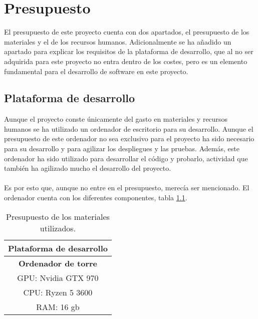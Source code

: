 \chapter{Presupuesto}
\thispagestyle{fancy}
El presupuesto de este proyecto cuenta con dos apartados, el presupuesto de los materiales y el de los recursos humanos. Adicionalmente se ha añadido un apartado para explicar los requisitos de la plataforma de desarrollo, que al no ser adquirida para este proyecto no entra dentro de los costes, pero es un elemento fundamental para el desarrollo de software en este proyecto. 

\section{Plataforma de desarrollo}
Aunque el proyecto conste únicamente del gasto en materiales y recursos humanos se ha utilizado un ordenador de escritorio para su desarrollo. Aunque el presupuesto de este ordenador no sea exclusivo para el proyecto ha sido necesario para su desarrollo y para agilizar los despliegues y las pruebas. Además, este ordenador ha sido utilizado para desarrollar el código y probarlo, actividad que también ha agilizado mucho el desarrollo del proyecto.
\\ \\
Es por esto que, aunque no entre en el presupuesto, merecía ser mencionado. El ordenador cuenta con los diferentes componentes, tabla \ref{tab:PlataformaDesarrollo}.

\begin{table}[H]
    \begin{center}
        \begin{tabular}{|c|}
            \hline
            \rowcolor{Cyan} 
            \textbf{Plataforma de desarrollo} \\ 
            \hline
            \rowcolor{GrisTabla}
            \textbf{Ordenador de torre} \\
            \hline
            GPU: Nvidia GTX 970 \\
            \hline
            CPU: Ryzen 5 3600 \\
            \hline
            RAM: 16 gb \\
            \hline
        \end{tabular}
        \caption{\centering Presupuesto de los materiales utilizados.}
        \label{tab:PlataformaDesarrollo}
    \end{center}    
\end{table}


